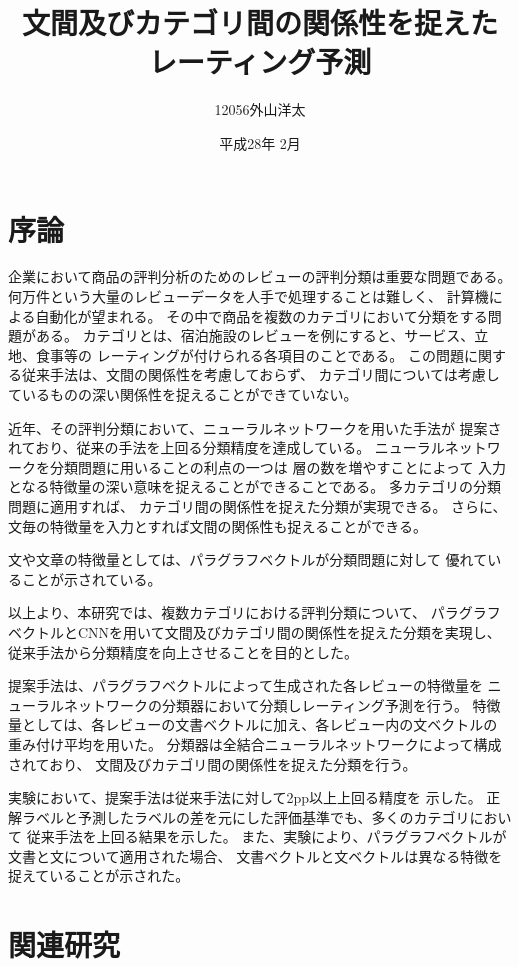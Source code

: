 \documentclass{ttithesis}
\title{文間及びカテゴリ間の関係性を捉えた\\レーティング予測}
\author{12056\hspace{16ex}外山洋太}
\date{平成28年 2月}
\begin{document}
\section{序論}

企業において商品の評判分析のためのレビューの評判分類は重要な問題である。
何万件という大量のレビューデータを人手で処理することは難しく、
計算機による自動化が望まれる。
その中で商品を複数のカテゴリにおいて分類をする問題がある。
カテゴリとは、宿泊施設のレビューを例にすると、サービス、立地、食事等の
レーティングが付けられる各項目のことである。
この問題に関する従来手法\cite{fujitani15}は、文間の関係性を考慮しておらず、
カテゴリ間については考慮しているものの深い関係性を捉えることができていない。

近年、その評判分類において、ニューラルネットワークを用いた手法が
提案されており、従来の手法を上回る分類精度を達成している。
ニューラルネットワークを分類問題に用いることの利点の一つは
層の数を増やすことによって
入力となる特徴量の深い意味を捉えることができることである。
多カテゴリの分類問題に適用すれば、
カテゴリ間の関係性を捉えた分類が実現できる。
さらに、文毎の特徴量を入力とすれば文間の関係性も捉えることができる。

文や文章の特徴量としては、パラグラフベクトル\cite{quoc14}が分類問題に対して
優れていることが示されている。

以上より、本研究では、複数カテゴリにおける評判分類について、
パラグラフベクトルとCNNを用いて文間及びカテゴリ間の関係性を捉えた分類を実現し、
従来手法から分類精度を向上させることを目的とした。

提案手法は、パラグラフベクトルによって生成された各レビューの特徴量を
ニューラルネットワークの分類器において分類しレーティング予測を行う。
特徴量としては、各レビューの文書ベクトルに加え、各レビュー内の文ベクトルの
重み付け平均を用いた。
分類器は全結合ニューラルネットワークによって構成されており、
文間及びカテゴリ間の関係性を捉えた分類を行う。

実験において、提案手法は従来手法\cite{fujitani15}に対して2pp以上上回る精度を
示した。
正解ラベルと予測したラベルの差を元にした評価基準でも、多くのカテゴリにおいて
従来手法\cite{fujitani15}を上回る結果を示した。
また、実験により、パラグラフベクトルが文書と文について適用された場合、
文書ベクトルと文ベクトルは異なる特徴を捉えていることが示された。



\section{関連研究}
\end{document}
